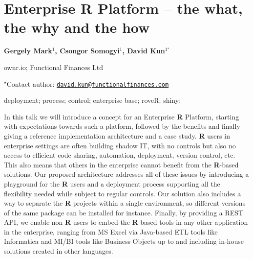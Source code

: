 \documentclass[\main/boa.tex]{subfiles}
\begin{document}
\pagestyle{empty}

\section{Enterprise R Platform -- the what, the why and the how}

\begin{center}
  {\bf Gergely Mark$^{1}$, Csongor Somogyi$^{1}$, David Kun$^{1^\star}$}
\end{center}

\vskip 0.3cm

\begin{affiliations}
\begin{enumerate}
\begin{minipage}{0.915\textwidth}
\centering
\item ownr.io; Functional Finances Ltd \\[-2pt]
\end{minipage}
\end{enumerate}
$^\star$Contact author: \href{mailto:david.kun@functionalfinances.com}{\nolinkurl{david.kun@functionalfinances.com}}\\
\end{affiliations}

\vskip 0.5cm

\begin{minipage}{0.915\textwidth}
\keywords deployment; process; control; enterprise
\packages base; roveR; shiny;
\end{minipage}

\vskip 0.8cm

In this talk we will introduce a concept for an Enterprise \textbf{R}
Platform, starting with expectations towards such a platform, followed
by the benefits and finally giving a reference implementation
architecture and a case study. \textbf{R} users in enterprise settings
are often building shadow IT, with no controls but also no access to
efficient code sharing, automation, deployment, version control, etc.
This also means that others in the enterprise cannot benefit from the
\textbf{R}-based solutions. Our proposed architecture addresses all of
these issues by introducing a playground for the \textbf{R} users and a
deployment process supporting all the flexibility needed while subject
to regular controls. Our solution also includes a way to separate the
\textbf{R} projects within a single environment, so different versions
of the same package can be installed for instance. Finally, by providing
a REST API, we enable non-\textbf{R} users to embed the \textbf{R}-based
tools in any other application in the enterprise, ranging from MS Excel
via Java-based ETL tools like Informatica and MI/BI tools like Business
Objects up to and including in-house solutions created in other
languages.
\end{document}

